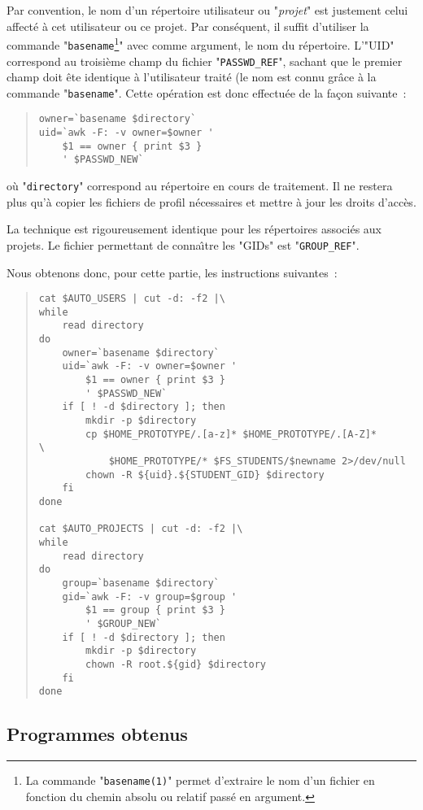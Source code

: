 Par convention, le nom d'un r{\'e}pertoire utilisateur ou "{\sl projet}" est justement
celui affect{\'e} {\`a} cet utilisateur ou ce projet. Par cons{\'e}quent, il suffit d'utiliser
la commande "{\tt basename}\footnote{La commande "{\tt basename(1)}" permet
d'extraire le nom d'un fichier en fonction du chemin absolu ou relatif pass{\'e} en
argument.}" avec comme argument, le nom du r{\'e}pertoire. L'"UID" 
correspond au troisi{\`e}me champ du fichier "{\tt PASSWD\_REF}", sachant que le premier
champ doit {\^e}te identique {\`a} l'utilisateur trait{\'e} (le nom est connu gr{\^a}ce {\`a} la commande
"{\tt basename}". Cette op{\'e}ration est donc effectu{\'e}e de la fa\c{c}on suivante~:
\begin{quote}
\begin{verbatim}
owner=`basename $directory`
uid=`awk -F: -v owner=$owner '
    $1 == owner { print $3 }
    ' $PASSWD_NEW`
\end{verbatim}
\end{quote}
o{\`u} "{\tt directory}" correspond au r{\'e}pertoire en cours de traitement. Il ne restera plus
qu'{\`a} copier les fichiers de profil n{\'e}cessaires et mettre {\`a} jour les droits d'acc{\`e}s.

La technique est rigoureusement identique pour les r{\'e}pertoires associ{\'e}s aux projets. Le
fichier permettant de conna{\^\i}tre les "GIDs" est "{\tt GROUP\_REF}".

Nous obtenons donc, pour cette partie, les instructions suivantes~:
\begin{quote}
\begin{verbatim}
cat $AUTO_USERS | cut -d: -f2 |\
while
    read directory
do
    owner=`basename $directory`
    uid=`awk -F: -v owner=$owner '
        $1 == owner { print $3 }
        ' $PASSWD_NEW`
    if [ ! -d $directory ]; then
        mkdir -p $directory
        cp $HOME_PROTOTYPE/.[a-z]* $HOME_PROTOTYPE/.[A-Z]*      \
            $HOME_PROTOTYPE/* $FS_STUDENTS/$newname 2>/dev/null
        chown -R ${uid}.${STUDENT_GID} $directory
    fi
done

cat $AUTO_PROJECTS | cut -d: -f2 |\
while
    read directory
do
    group=`basename $directory`
    gid=`awk -F: -v group=$group '
        $1 == group { print $3 }
        ' $GROUP_NEW`
    if [ ! -d $directory ]; then
        mkdir -p $directory
        chown -R root.${gid} $directory
    fi
done
\end{verbatim}
\end{quote}

\subsection{\label{adv-programming-ex3-pgm}Programmes obtenus}

